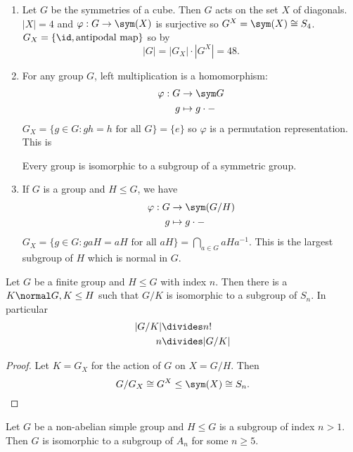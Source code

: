 \documentclass[a4paper]{article}
\theoremstyle{definition}
\begin{document}
\begin{eg}\leavevmode
  \begin{enumerate}
  \item Let \(G\) be the symmetries of a cube. Then \(G\) acts on the set \(X\) of diagonals. \(|X| = 4\) and \(\varphi: G \to \sym(X)\) is surjective so \(G^X = \sym(X) \cong S_4\). \(G_X = \{\id, \text{antipodal map}\}\) so by 
    \[
      |G| = |G_X| \cdot |G^X| = 48.
    \]
  \item For any group \(G\), left multiplication is a homomorphism:
    \begin{align*}
      \varphi: G &\to \sym G \\
      g &\mapsto g \cdot -
    \end{align*}
    \(G_X = \{g \in G: gh = h \text{ for all } G\} = \{e\}\) so \(\varphi\) is a permutation representation. This is

    \begin{theorem}[Cayley]
      Every group is isomorphic to a subgroup of a symmetric group.
    \end{theorem}
  \item If \(G\) is a group and \(H \leq G\), we have
    \begin{align*}
      \varphi: G &\to \sym(G/H) \\
      g &\mapsto g \cdot -
    \end{align*}
    \(G_X = \{g \in G: gaH = aH \text{ for all } aH\} = \bigcap_{a \in G} aHa^{-1}\). This is the largest subgroup of \(H\) which is normal in \(G\).
  \end{enumerate}
\end{eg}

\begin{theorem}
  Let \(G\) be a finite group and \(H \leq G\) with index \(n\). Then there is a \(K \normal G, K \leq H\) such that \(G/K\) is isomorphic to a subgroup of \(S_n\). In particular
  \begin{align*}
    |G/K| &\divides n! \\
    n &\divides |G/K|
  \end{align*}
\end{theorem}

\begin{proof}
  Let \(K = G_X\) for the action of \(G\) on \(X = G/H\). Then
  \[
    G/G_X \cong G^X \leq \sym(X) \cong S_n.
  \]
\end{proof}

\begin{theorem}
  \label{thm:non-abelian simple group}
  Let \(G\) be a non-abelian simple group and \(H \leq G\) is a subgroup of index \(n > 1\). Then \(G\) is isomorphic to a subgroup of \(A_n\) for some \(n \geq 5\).
\end{theorem}
\end{document}
